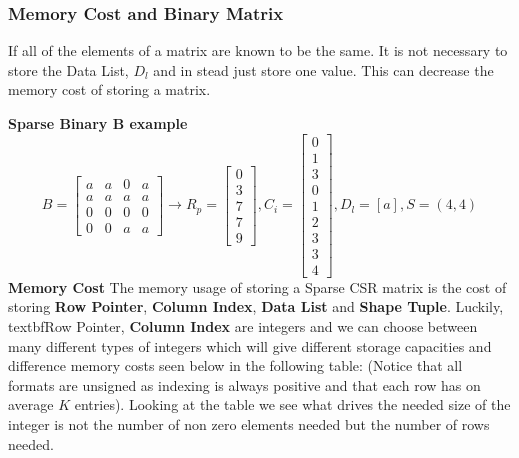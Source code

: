 \documentclass[12pt]{article}
\begin{document}
\subsubsection{Memory Cost and Binary Matrix}
If all of the elements of a matrix are known to be the same. It is not necessary to store the Data List, $D_l$ and in stead just store one value. This can decrease the memory cost of storing a matrix.

\noindent
\textbf{Sparse Binary B example}
\begin{equation*}
	B=
	\begin{bmatrix}
		a&a&0&a\\
		a&a&a&a\\
		0&0&0&0\\
		0&0&a&a
	\end{bmatrix} 
	\rightarrow
	R_p=
	\begin{bmatrix}
		0\\
		3\\
		7\\
		7\\
		9
	\end{bmatrix},
		C_i=
	\begin{bmatrix}
		0\\
		1\\
		3\\
		0\\
		1\\
		2\\
		3\\
		3\\
		4
	\end{bmatrix},
	D_l = [a],
	S = (4,4)
\end{equation*}
\noindent
\textbf{Memory Cost}
The memory usage of storing a Sparse CSR matrix is the cost of storing \textbf{Row Pointer}, \textbf{Column Index}, \textbf{Data List} and \textbf{Shape Tuple}. Luckily, textbf{Row Pointer}, \textbf{Column Index} are integers and we can choose between many different types of integers which will give different storage capacities and difference memory costs seen below in the following table: (Notice that all formats are unsigned as indexing is always positive and that each row has on average $K$ entries). Looking at the table we see what drives the needed size of the integer is not the number of non zero elements needed but the number of rows needed.  
\end{document}
